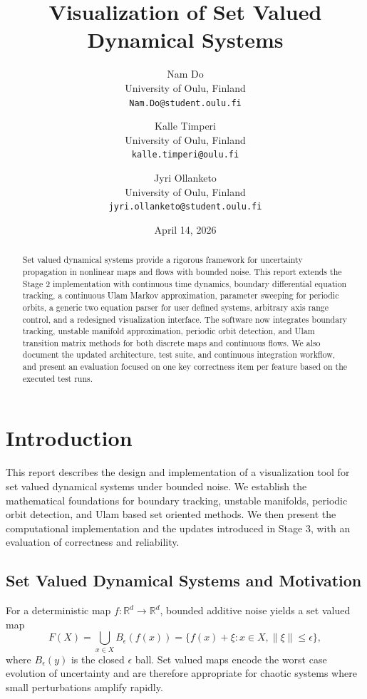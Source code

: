 \documentclass[11pt,twocolumn]{article}
\title{Visualization of Set Valued Dynamical Systems}
\author{Nam Do\\University of Oulu, Finland\\\texttt{Nam.Do@student.oulu.fi} \and Kalle Timperi\\University of Oulu, Finland\\\texttt{kalle.timperi@oulu.fi} \and Jyri Ollanketo\\University of Oulu, Finland\\\texttt{jyri.ollanketo@student.oulu.fi}}
\date{April 14, 2026}
\begin{document}
\maketitle

\begin{abstract}
Set valued dynamical systems provide a rigorous framework for uncertainty propagation in nonlinear maps and flows with bounded noise. This report extends the Stage 2 implementation with continuous time dynamics, boundary differential equation tracking, a continuous Ulam Markov approximation, parameter sweeping for periodic orbits, a generic two equation parser for user defined systems, arbitrary axis range control, and a redesigned visualization interface. The software now integrates boundary tracking, unstable manifold approximation, periodic orbit detection, and Ulam transition matrix methods for both discrete maps and continuous flows. We also document the updated architecture, test suite, and continuous integration workflow, and present an evaluation focused on one key correctness item per feature based on the executed test runs.
\end{abstract}

\section{Introduction}
This report describes the design and implementation of a visualization tool for set valued dynamical systems under bounded noise. We establish the mathematical foundations for boundary tracking, unstable manifolds, periodic orbit detection, and Ulam based set oriented methods. We then present the computational implementation and the updates introduced in Stage 3, with an evaluation of correctness and reliability.

\subsection{Set Valued Dynamical Systems and Motivation}
For a deterministic map $f: \mathbb{R}^d \to \mathbb{R}^d$, bounded additive noise yields a set valued map
\begin{equation}
F(X) = \bigcup_{x \in X} B_{\epsilon}(f(x))
= \{f(x) + \xi : x \in X, \|\xi\| \le \epsilon\},
\end{equation}
where $B_{\epsilon}(y)$ is the closed $\epsilon$ ball. Set valued maps encode the worst case evolution of uncertainty and are therefore appropriate for chaotic systems where small perturbations amplify rapidly.
\end{document}
